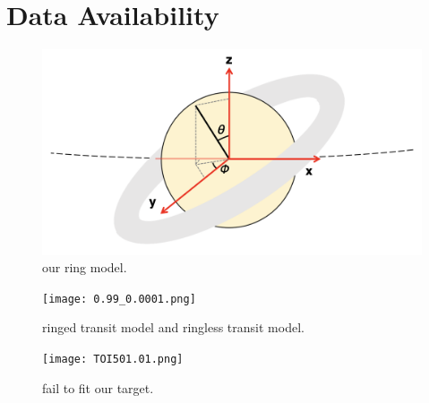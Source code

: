 \documentclass[fleqn,usenatbib, onecolumn,dvipdfmx]{mnras}
\begin{document}
\section*{Data Availability}



\begin{figure}
  \centering
  \includegraphics[width=\textwidth]{ring_model_explain.png}
  \caption{our ring model.}
  \label{fig:ring_model_explain}
\end{figure}

\begin{figure}
  \centering
  \texttt{[image: 0.99\_0.0001.png]}
  \caption{ringed transit model and ringless transit model.}
  \label{fig:fitting simulation}
\end{figure}

\begin{figure}
  \centering
  \texttt{[image: TOI501.01.png]}
  \caption{fail to fit our target.}
  \label{fig: fail fitting}
\end{figure}

\label{fig:analysis_flow}
\end{document}
